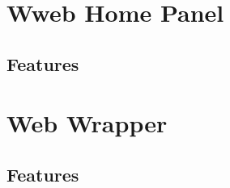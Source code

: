 \documentclass[../main.tex]{subfiles}
\begin{document}
\chapter{Wweb Home Panel}
\section{Features}
\chapter{Web Wrapper}
\section{Features}
\end{document}
